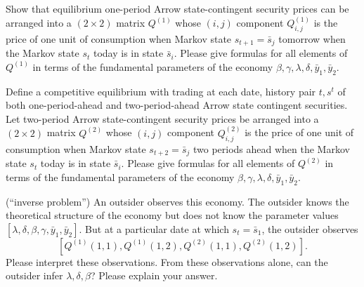 \medskip

  Show that equilibrium  one-period Arrow state-contingent security prices can be arranged into a $(2 \times 2)$ matrix $Q^{(1)}$ whose  $(i,j)$ component $Q^{(1)}_{i,j}$
is the price of one unit of consumption when Markov state $s_{t+1} = \bar s_j$   tomorrow  when the Markov state $s_t$ today is in state $\bar s_i$.
Please give formulas for all elements of $Q^{(1)}$ in terms of the fundamental parameters of the economy $\beta, \gamma, \lambda, \delta, \bar y_1, \bar y_2$.

\medskip

  Define a competitive equilibrium with trading at each date, history pair $t, s^t$ of both one-period-ahead and two-period-ahead Arrow state contingent securities.
Let  two-period Arrow state-contingent security prices be arranged into a $(2 \times 2)$ matrix $Q^{(2)}$ whose  $(i,j)$ component
$Q^{(2)}_{i,j}$ is the price of one unit of consumption when Markov state $s_{t+2} = \bar s_j$   two periods ahead  when the Markov state $s_t$ today is in state $\bar s_i$.
Please give formulas for all elements of $Q^{(2)}$ in terms of the fundamental parameters of the economy $\beta, \gamma, \lambda, \delta, \bar y_1, \bar y_2$.

\medskip

 (``inverse problem'')  An outsider observes this economy. The outsider knows the theoretical structure of the economy but does not know the parameter values $[\lambda, \delta, \beta,
\gamma, \bar y_1, \bar y_2]$. But at a particular date at which $s_t = \bar s_1$, the outsider observes
$$[Q^{(1)}(1,1), Q^{(1)}(1,2), Q^{(2)}(1,1), Q^{(2)}(1,2)] .$$
Please interpret these observations.
From these observations
alone, can the outsider infer $\lambda, \delta,  \beta$?   Please explain your answer.




\eqnotracefalse
